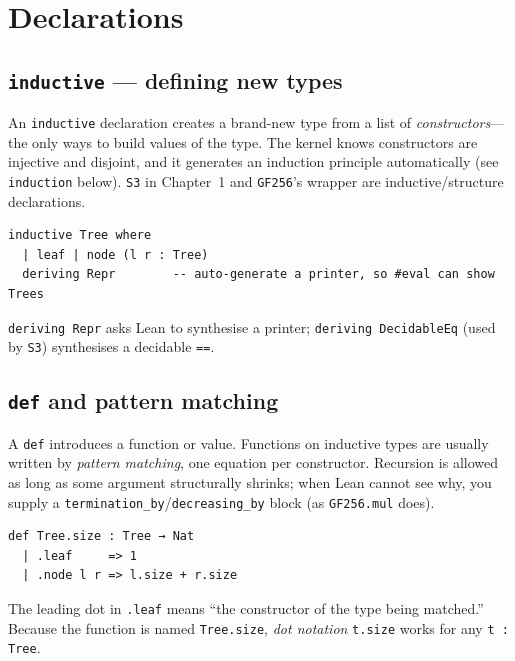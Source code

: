 \documentclass[11pt, a4paper, oneside]{book}
\newcommand{\lc}[1]{\texttt{#1}}
\begin{document}
\section{Declarations}

\subsection*{\lc{inductive} --- defining new types}

An \lc{inductive} declaration creates a brand-new type from a list of
\emph{constructors}---the only ways to build values of the type. The kernel
knows constructors are injective and disjoint, and it generates an induction
principle automatically (see \lc{induction} below). \lc{S3} in Chapter~1 and
\lc{GF256}'s wrapper are inductive/structure declarations.

\begin{leanbox}
\begin{verbatim}
inductive Tree where
  | leaf | node (l r : Tree)
  deriving Repr        -- auto-generate a printer, so #eval can show Trees
\end{verbatim}
\end{leanbox}

\lc{deriving Repr} asks Lean to synthesise a printer; \lc{deriving DecidableEq}
(used by \lc{S3}) synthesises a decidable \lc{==}.

\subsection*{\lc{def} and pattern matching}

A \lc{def} introduces a function or value. Functions on inductive types are
usually written by \emph{pattern matching}, one equation per constructor.
Recursion is allowed as long as some argument structurally shrinks; when Lean
cannot see why, you supply a \lc{termination\_by}/\lc{decreasing\_by} block (as
\lc{GF256.mul} does).

\begin{leanbox}
\begin{verbatim}
def Tree.size : Tree → Nat
  | .leaf     => 1
  | .node l r => l.size + r.size
\end{verbatim}
\end{leanbox}

The leading dot in \lc{.leaf} means ``the constructor of the type being
matched.'' Because the function is named \lc{Tree.size}, \emph{dot notation}
\lc{t.size} works for any \lc{t : Tree}.
\end{document}

